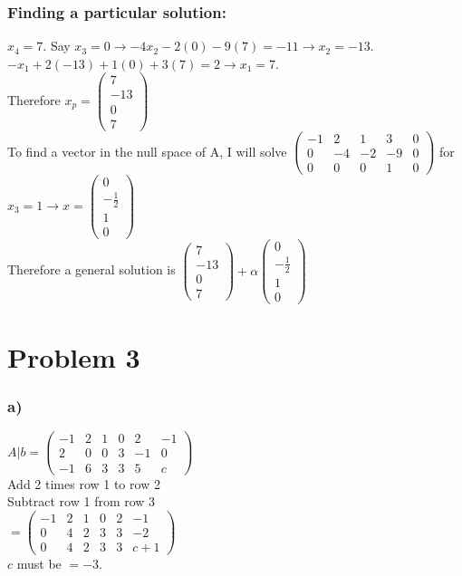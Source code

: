 \documentclass[fleqn]{article}
\begin{document}
\subsubsection*{Finding a particular solution:}
$x_4 = 7$.  Say $x_3 = 0 \rightarrow -4x_2-2(0)-9(7)=-11 \rightarrow x_2 = -13$.  $-x_1+2(-13)+1(0)+3(7)=2 \rightarrow x_1 = 7$.\\
Therefore $x_p = \begin{pmatrix}7\\-13\\0\\7\end{pmatrix}$\\
To find a vector in the null space of A, I will solve
$\begin{pmatrix}-1&2&1&3&0\\0&-4&-2&-9&0\\ 0&0&0&1&0\end{pmatrix}$ for $x_3 = 1 \rightarrow x = \begin{pmatrix}0\\ -\frac{1}{2}\\1\\0\end{pmatrix}$\\
\linebreak
Therefore a general solution is $\begin{pmatrix}7\\-13\\0\\7\end{pmatrix} + \alpha \begin{pmatrix}0\\ -\frac{1}{2}\\1\\0\end{pmatrix}$
\section*{Problem 3}
\subsubsection*{a)}
$A|b= \begin{pmatrix}-1&2&1&0&2&-1\\2&0&0&3&-1&0\\-1&6&3&3&5&c\end{pmatrix}$\\
\linebreak
\indent Add 2 times row 1 to row 2\\
\indent Subtract row 1 from row 3\\
\linebreak
$= \begin{pmatrix}-1&2&1&0&2&-1\\0&4&2&3&3&-2\\0&4&2&3&3&c+1\end{pmatrix}$\\
\linebreak
$c$ must be $ = -3$.
\end{document}
